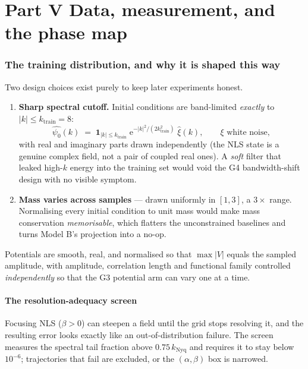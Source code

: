 \documentclass[11pt,a4paper]{article}
\theoremstyle{plain}
\theoremstyle{definition}
\theoremstyle{remark}
\newcommand{\eu}{\mathrm{e}}
\newcommand{\ktrain}{k_{\mathrm{train}}}
\newcommand{\knyq}{k_{\mathrm{Nyq}}}
\begin{document}
\part*{Part V \quad Data, measurement, and the phase map}

\section{The training distribution, and why it is shaped this way}
\label{sec:datadesign}

Two design choices exist purely to keep later experiments honest.

\begin{enumerate}[leftmargin=1.4em,itemsep=0.4em]
\item \textbf{Sharp spectral cutoff.} Initial conditions are band-limited \emph{exactly}
to $|k|\le\ktrain=8$:
\[
\widehat{\psi_0}(k) \;=\; \mathbf{1}_{|k|\le \ktrain}\;\eu^{-|k|^2/(2\ktrain^2)}\;\widehat{\xi}(k),
\qquad \xi \text{ white noise},
\]
with real and imaginary parts drawn independently (the NLS state is a genuine complex
field, not a pair of coupled real ones). A \emph{soft} filter that leaked high-$k$ energy
into the training set would void the G4 bandwidth-shift design with no visible symptom.

\item \textbf{Mass varies across samples} --- drawn uniformly in $[1,3]$, a $3\times$
range. Normalising every initial condition to unit mass would make mass conservation
\emph{memorisable}, which flatters the unconstrained baselines and turns Model B's
projection into a no-op.
\end{enumerate}

Potentials are smooth, real, and normalised so that $\max|V|$ equals the sampled
amplitude, with amplitude, correlation length and functional family controlled
\emph{independently} so that the G3 potential arm can vary one at a time.

\subsection{The resolution-adequacy screen}

Focusing NLS ($\beta>0$) can steepen a field until the grid stops resolving it, and the
resulting error looks exactly like an out-of-distribution failure. The screen measures the
spectral tail fraction above $0.75\,\knyq$ and requires it to stay below $10^{-6}$;
trajectories that fail are excluded, or the $(\alpha,\beta)$ box is narrowed.
\end{document}
